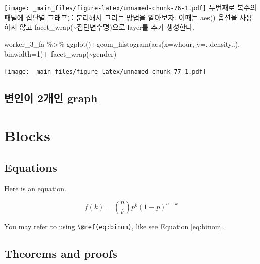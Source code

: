 \documentclass[
]{book}
\newenvironment{Shaded}{\begin{snugshade}}{\end{snugshade}}
\newcommand{\AttributeTok}[1]{\textcolor[rgb]{0.77,0.63,0.00}{#1}}
\newcommand{\DecValTok}[1]{\textcolor[rgb]{0.00,0.00,0.81}{#1}}
\newcommand{\FunctionTok}[1]{\textcolor[rgb]{0.00,0.00,0.00}{#1}}
\newcommand{\NormalTok}[1]{#1}
\newcommand{\SpecialCharTok}[1]{\textcolor[rgb]{0.00,0.00,0.00}{#1}}
\theoremstyle{definition}
\theoremstyle{definition}
\theoremstyle{definition}
\theoremstyle{definition}
\theoremstyle{remark}
\begin{document}
\texttt{[image: \_main\_files/figure-latex/unnamed-chunk-76-1.pdf]}
두번째로 복수의 패널에 집단별 그래프를 분리해서 그리는 방법을 알아보자. 이때는 aes() 옵션을 사용하지 않고 facet\_wrap(\textasciitilde 집단변수명)으로 layer를 추가 생성한다.

\begin{Shaded}
\begin{Highlighting}[]
\NormalTok{worker\_3\_fa }\SpecialCharTok{\%\textgreater{}\%} 
  \FunctionTok{ggplot}\NormalTok{()}\SpecialCharTok{+}\FunctionTok{geom\_histogram}\NormalTok{(}\FunctionTok{aes}\NormalTok{(}\AttributeTok{x=}\NormalTok{whour, }\AttributeTok{y=}\NormalTok{..density..), }\AttributeTok{binwidth=}\DecValTok{1}\NormalTok{)}\SpecialCharTok{+}
  \FunctionTok{facet\_wrap}\NormalTok{(}\SpecialCharTok{\textasciitilde{}}\NormalTok{gender)}
\end{Highlighting}
\end{Shaded}

\texttt{[image: \_main\_files/figure-latex/unnamed-chunk-77-1.pdf]}

\hypertarget{uxbcc0uxc778uxc774-2uxac1cuxc778-graph}{%
\section{변인이 2개인 graph}\label{uxbcc0uxc778uxc774-2uxac1cuxc778-graph}}

\hypertarget{blocks}{%
\chapter{Blocks}\label{blocks}}

\hypertarget{equations}{%
\section{Equations}\label{equations}}

Here is an equation.

\begin{equation} 
  f\left(k\right) = \binom{n}{k} p^k\left(1-p\right)^{n-k}
  \label{eq:binom}
\end{equation}

You may refer to using \texttt{\textbackslash{}@ref(eq:binom)}, like see Equation \eqref{eq:binom}.

\hypertarget{theorems-and-proofs}{%
\section{Theorems and proofs}\label{theorems-and-proofs}}
\end{document}
